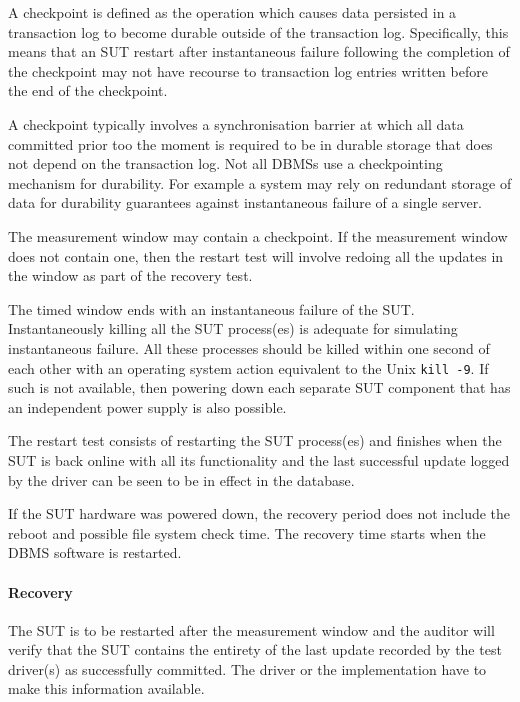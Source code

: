 A checkpoint is defined as the operation which causes data persisted in a transaction log to become durable outside of the transaction log. Specifically, this means that an SUT restart after instantaneous failure following the completion of the checkpoint may not have recourse to transaction log entries written before the end of the checkpoint.

A checkpoint typically involves a synchronisation barrier at which all data committed prior too the moment is required to be in durable storage that does not depend on the transaction log.
Not all DBMSs use a checkpointing mechanism for durability. For example a system may rely on redundant storage of data for durability guarantees against instantaneous failure of a single server.

The measurement window may contain a checkpoint. If the measurement window does not contain one, then the restart test will involve redoing all the updates in the window as part of the recovery test.

The timed window ends with an instantaneous failure of the SUT. Instantaneously killing all the SUT process(es) is adequate for simulating instantaneous failure. All these processes should be killed within one second of each other with an operating system action equivalent to the Unix \verb+kill -9+. If such is not available, then powering down each separate SUT component that has an independent power supply is also possible.

The restart test consists of restarting the SUT process(es) and finishes when the SUT is back online with all its functionality and the last successful update logged by the driver can be seen to be in effect in the database.

If the SUT hardware was powered down, the recovery period does not include the reboot and possible file system check time. The recovery time starts when the DBMS software is restarted.




\paragraph{Recovery} 
The SUT is to be restarted after the measurement window and the auditor will verify that the SUT contains the entirety of the last update recorded by the test driver(s) as successfully committed. The driver or the implementation have to make this information available.

